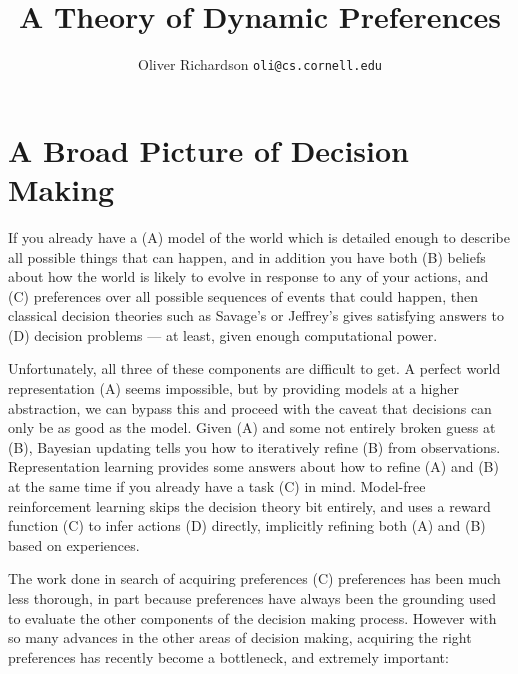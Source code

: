 \documentclass{article}
\title{A Theory of Dynamic Preferences}
\author{Oliver Richardson  \texttt{oli@cs.cornell.edu}}
\begin{document}
	\maketitle
	\section{A Broad Picture of Decision Making}
	If you already have a (A) model of the world which is detailed enough to describe all possible things that can happen, and in addition you have both (B) beliefs about how the world is likely to evolve in response to any of your actions, and (C) preferences over all possible sequences of events that could happen, then classical decision theories such as Savage's \cite{savage1972foundations} or Jeffrey's \cite{jeffrey1990logic} gives satisfying answers to (D) decision problems  --- at least, given enough computational power.
	
	Unfortunately, all three of these components are difficult to get. A perfect world representation (A) seems impossible, but by providing models at a higher abstraction, we can bypass this and proceed with the caveat that decisions can only be as good as the model. Given (A) and some not entirely broken guess at (B), Bayesian updating tells you how to iteratively refine (B) from observations. Representation learning provides some answers about how to refine (A) and (B) at the same time if you already have a task (C) in mind. Model-free reinforcement learning skips the decision theory bit entirely, and uses a reward function (C) to infer actions (D) directly, implicitly refining both (A) and (B) based on experiences.
		
	The work done in search of acquiring preferences (C) preferences has been much less thorough, in part because preferences have always been the grounding used to evaluate the other components of the decision making process. However with so many advances in the other areas of decision making, acquiring the right preferences has recently become a bottleneck, and extremely important: 
	
\end{document}
